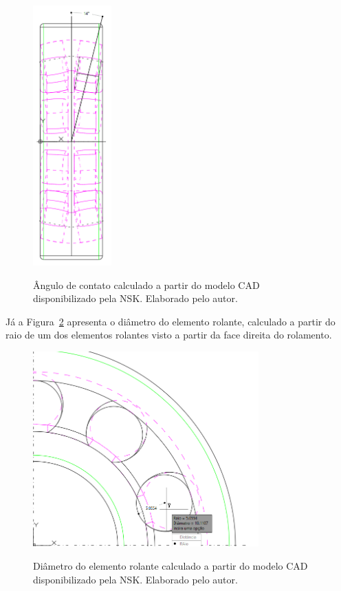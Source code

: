 \documentclass[
	12pt,				
	oneside,			
	a4paper,			
	english,			
	brazil,			
	]{abntex2ppgsi}
\begin{document}
\begin{figure}[H]
\centering
\caption {Ângulo de contato calculado a partir do modelo CAD disponibilizado pela NSK. Elaborado pelo autor.}
\includegraphics[width=\textwidth,height=100mm,keepaspectratio]{angulo_de_contato}
\label{angulo_de_contato}
\end{figure} 

Já a Figura~\ref{diametro_rolamento} apresenta o diâmetro do elemento rolante, calculado a partir do raio de um dos elementos rolantes visto a partir da face direita do rolamento. 

\begin{figure}[H]
\centering
\caption {Diâmetro do elemento rolante calculado a partir do modelo CAD disponibilizado pela NSK. Elaborado pelo autor.}
\includegraphics[width=\textwidth,height=75mm,keepaspectratio]{diametro_rolamento}
\label{diametro_rolamento}
\end{figure} 
\end{document}
